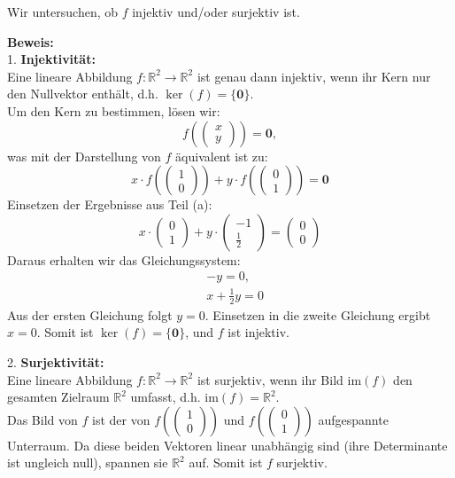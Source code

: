 \documentclass[11pt]{article}
\begin{document}
Wir untersuchen, ob \( f \) injektiv und/oder surjektiv ist.

\textbf{Beweis:} \\
1. \textbf{Injektivität:} \\
Eine lineare Abbildung \( f: \mathbb{R}^2 \to \mathbb{R}^2 \) ist genau dann injektiv, wenn ihr Kern nur den Nullvektor enthält, d.h. \( \ker(f) = \{ \mathbf{0} \} \). \\
Um den Kern zu bestimmen, lösen wir:
\[
f\left(\begin{pmatrix} x \\ y \end{pmatrix}\right) = \mathbf{0},
\]
was mit der Darstellung von \( f \) äquivalent ist zu:
\[
x \cdot f\left(\begin{pmatrix} 1 \\ 0 \end{pmatrix}\right) + y \cdot f\left(\begin{pmatrix} 0 \\ 1 \end{pmatrix}\right) = \mathbf{0}
\]
Einsetzen der Ergebnisse aus Teil (a):
\[
x \cdot \begin{pmatrix} 0 \\ 1 \end{pmatrix} + y \cdot \begin{pmatrix} -1 \\ \frac{1}{2} \end{pmatrix} = \begin{pmatrix} 0 \\ 0 \end{pmatrix}
\]
Daraus erhalten wir das Gleichungssystem:
\[
\begin{aligned}
&-y = 0, \\
&x + \frac{1}{2}y = 0
\end{aligned}
\]
Aus der ersten Gleichung folgt \( y = 0 \). Einsetzen in die zweite Gleichung ergibt \( x = 0 \). Somit ist \( \ker(f) = \{ \mathbf{0} \} \), und \( f \) ist injektiv.

2. \textbf{Surjektivität:} \\
Eine lineare Abbildung \( f: \mathbb{R}^2 \to \mathbb{R}^2 \) ist surjektiv, wenn ihr Bild \( \mathrm{im}(f) \) den gesamten Zielraum \( \mathbb{R}^2 \) umfasst, d.h. \( \mathrm{im}(f) = \mathbb{R}^2 \). \\
Das Bild von \( f \) ist der von \( f\left(\begin{pmatrix} 1 \\ 0 \end{pmatrix}\right) \) und \( f\left(\begin{pmatrix} 0 \\ 1 \end{pmatrix}\right) \) aufgespannte Unterraum. Da diese beiden Vektoren linear unabhängig sind (ihre Determinante ist ungleich null), spannen sie \( \mathbb{R}^2 \) auf. Somit ist \( f \) surjektiv.
\end{document}
